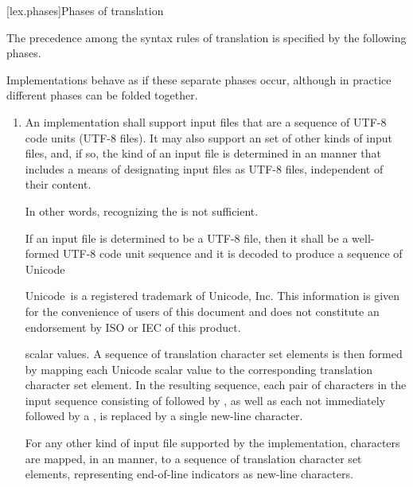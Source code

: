 [lex.phases]{Phases of translation}%

\pnum
{}%
The precedence among the syntax rules of translation is specified by the
following phases.
\begin{footnote}
Implementations behave as if these separate phases
occur, although in practice different phases can be folded together.
\end{footnote}

\begin{enumerate}
\item
{}%
An implementation shall support input files
that are a sequence of UTF-8 code units (UTF-8 files).
It may also support
an  set of other kinds of input files, and,
if so, the kind of an input file is determined in
an  manner
that includes a means of designating input files as UTF-8 files,
independent of their content.
\begin{note}
In other words,
recognizing the  is not sufficient.
\end{note}
If an input file is determined to be a UTF-8 file,
then it shall be a well-formed UTF-8 code unit sequence and
it is decoded to produce a sequence of Unicode
\begin{footnote}
Unicode\textregistered\ is a registered trademark of Unicode, Inc.
This information is given for the convenience of users of this document and
does not constitute an endorsement by ISO or IEC of this product.
\end{footnote}
scalar values.
A sequence of translation character set elements is then formed
by mapping each Unicode scalar value
to the corresponding translation character set element.
In the resulting sequence,
each pair of characters in the input sequence consisting of
 followed by ,
as well as each
 not immediately followed by a ,
is replaced by a single new-line character.

For any other kind of input file supported by the implementation,
characters are mapped, in an
 manner,
to a sequence of translation character set elements,
representing end-of-line indicators as new-line characters.


\end{enumerate}
